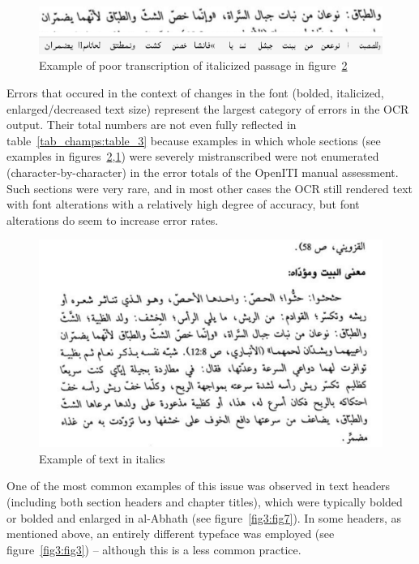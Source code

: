 \begin{figure}[h!tp]
	\includegraphics[width=\linewidth]{images/image6.png}
	\caption{Example of poor transcription of italicized passage in figure~\protect\ref{fig3:fig5}}
	\label{fig3:fig6}
\end{figure}


Errors that occured in the context of changes in the font (bolded, italicized,
enlarged/decreased text size) represent the largest category of errors in the
OCR output. Their total numbers are not even fully reflected in
table~\ref{tab_champs:table_3} because examples in which whole sections (see
examples in figures~\ref{fig3:fig5},\ref{fig3:fig6}) were severely
mistranscribed were not enumerated (character-by-character) in the error totals
of the OpenITI manual assessment. Such sections were very rare, and in most
other cases the OCR still rendered text with font alterations with a relatively
high degree of accuracy, but font alterations do seem to increase error rates.

\begin{figure}[h!tp]
	\includegraphics[width=\linewidth]{images/image19.png}
	\caption{Example of text in italics}
	\label{fig3:fig5}
\end{figure}

One of the most common examples of this issue was observed in text headers
(including both section headers and chapter titles), which were typically
bolded or bolded and enlarged in al-Abhath (see figure~\ref{fig3:fig7}). In some
headers, as mentioned above, an entirely different typeface was employed (see
figure~\ref{fig3:fig3}) -- although this is a less common practice.

